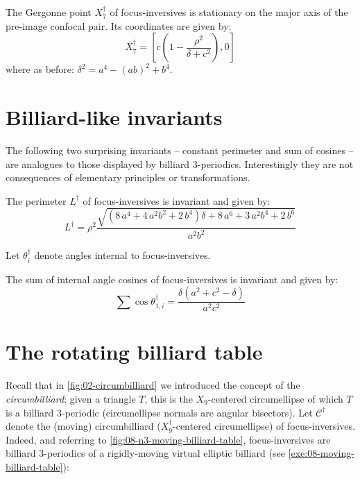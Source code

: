 \begin{proposition}
The Gergonne point $X_7^\dagger$ of focus-inversives is stationary on the major axis of the pre-image confocal pair. Its coordinates are given by:
\[ X_7^\dagger=\left[c\left(1-\frac{\rho^2}{\delta+c^2}\right),0\right]\]
where as before: $\delta^2=a^4-(a b)^2+b^4$.
\label{prop:08-gergonne}
\end{proposition} 

\section{Billiard-like invariants}

The following two surprising invariants -- constant perimeter and sum of cosines -- are analogues to those displayed by billiard 3-periodics. Interestingly they are not consequences of elementary principles or transformations. 

\begin{proposition}
The perimeter $L^\dagger$ of focus-inversives is invariant and given by: 
\[L^\dagger=\rho^2 \frac {\sqrt { \left( 8\,{a}^{4}+4\,{a}^{2}{b}^{2}+2\,{b}^{4}
 \right) \delta+8\,{a}^{6}+3\,{a}^{2}{b}^{4}+2\,{b}^{6}}}{{a}^{2}{b}^{
2}}\]
\label{prop:08-inv-perimeter}
\end{proposition}

Let $\theta_i^\dagger$ denote angles internal to focus-inversives. 

\begin{proposition}
The sum of internal angle cosines of focus-inversives is invariant and given by: 
\[
\sum\cos{\theta_{1,i}^\dagger}=\frac{\delta (a^2+c^2-\delta)}{a^2c^2} \]
\label{prop:08-inv-cos-sum}
\end{proposition}

\section{The rotating billiard table}

Recall that in \cref{fig:02-circumbilliard} we introduced the concept of the {\em circumbilliard}: given a triangle $T$, this is the $X_9$-centered circumellipse of which $T$ is a billiard 3-periodic (circumellipse normals are angular bisectors). Let  $\mathcal{C}^\dagger$ denote the (moving) circumbilliard ($X_9^\dagger$-centered circumellipse) of focus-inversives. Indeed, and referring to \cref{fig:08-n3-moving-billiard-table}, focus-inversives are billiard 3-periodics of a rigidly-moving virtual elliptic billiard (see \cref{exe:08-moving-billiard-table}):

